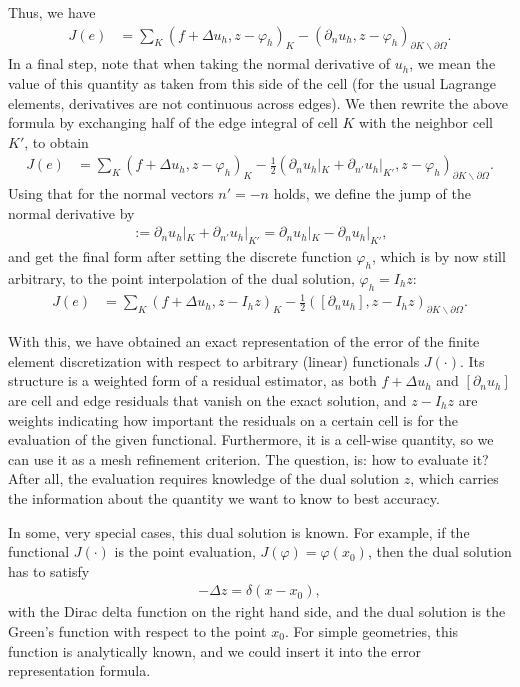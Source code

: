 \documentclass{article}
\begin{document}
Thus, we have 
\begin{align*}
  J(e)
  &=
  \sum_K (f+\Delta u_h, z-\varphi_h)_K
  - (\partial_n u_h, z-\varphi_h)_{\partial K\backslash \partial\Omega}.
\end{align*}
In a final step, note that when taking the normal derivative of $u_h$, we mean
the value of this quantity as taken from this side of the cell (for the usual
Lagrange elements, derivatives are not continuous across edges). We then
rewrite the above formula by exchanging half of the edge integral of cell $K$
with the neighbor cell $K'$, to obtain
\begin{align*}
  J(e)
  &=
  \sum_K (f+\Delta u_h, z-\varphi_h)_K
  - \frac 12 (\partial_n u_h|_K + \partial_{n'} u_h|_{K'},
              z-\varphi_h)_{\partial K\backslash \partial\Omega}.  
\end{align*}
Using that for the normal vectors $n'=-n$ holds, we define the jump of the
normal derivative by
\begin{gather*}
  [\partial_n u_h] := \partial_n u_h|_K + \partial_{n'} u_h|_{K'}
  =
  \partial_n u_h|_K - \partial_n u_h|_{K'},
\end{gather*}
and get the final form after setting the discrete function $\varphi_h$, which
is by now still arbitrary, to the point interpolation of the dual solution,
$\varphi_h=I_h z$:
\begin{align*}
  J(e)
  &=
  \sum_K (f+\Delta u_h, z-I_h z)_K
  - \frac 12 ([\partial_n u_h],
              z-I_h z)_{\partial K\backslash \partial\Omega}.  
\end{align*}

With this, we have obtained an exact representation of the error of the finite
element discretization with respect to arbitrary (linear) functionals
$J(\cdot)$. Its structure is a weighted form of a residual estimator, as both
$f+\Delta u_h$ and $[\partial_n u_h]$ are cell and edge residuals that vanish
on the exact solution, and $z-I_h z$ are weights indicating how important the
residuals on a certain cell is for the evaluation of the given functional.
Furthermore, it is a cell-wise quantity, so we can use it as a mesh refinement
criterion. The question, is: how to evaluate it? After all, the evaluation
requires knowledge of the dual solution $z$, which carries the information
about the quantity we want to know to best accuracy.

In some, very special cases, this dual solution is known. For example, if the
functional $J(\cdot)$ is the point evaluation, $J(\varphi)=\varphi(x_0)$, then
the dual solution has to satisfy
\begin{gather*}
  -\Delta z = \delta(x-x_0),
\end{gather*}
with the Dirac delta function on the right hand side, and the dual solution is
the Green's function with respect to the point $x_0$. For simple geometries,
this function is analytically known, and we could insert it into the error
representation formula.
\end{document}
